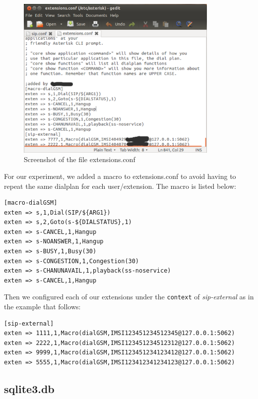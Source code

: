 \begin{figure}
  \centering
    \includegraphics[width=0.87\textwidth]{../images/ext_conf}
  \caption[Screenshot - extensions.conf]{Screenshot of the file \textsf{extensions.conf}}
  \label{ext_conf}
\end{figure}
For our experiment, we added a macro to \textsf{extensions.conf} to avoid
having to repeat the same dialplan for each user/extension. The macro is
listed below:
\begin{verbatim}
[macro-dialGSM]
exten => s,1,Dial(SIP/${ARG1})
exten => s,2,Goto(s-${DIALSTATUS},1)
exten => s-CANCEL,1,Hangup
exten => s-NOANSWER,1,Hangup
exten => s-BUSY,1,Busy(30)
exten => s-CONGESTION,1,Congestion(30)
exten => s-CHANUNAVAIL,1,playback(ss-noservice)
exten => s-CANCEL,1,Hangup
\end{verbatim}

Then we configured each of our extensions under the \texttt{context} of 
\textsl{sip-external} as in the example that follows: 
\begin{verbatim}
[sip-external]
exten => 1111,1,Macro(dialGSM,IMSI123451234512345@127.0.0.1:5062)
exten => 2222,1,Macro(dialGSM,IMSI123451234512312@127.0.0.1:5062)
exten => 9999,1,Macro(dialGSM,IMSI123451234123412@127.0.0.1:5062)
exten => 5555,1,Macro(dialGSM,IMSI123412341234123@127.0.0.1:5062)   
\end{verbatim}


\subsection{sqlite3.db}

